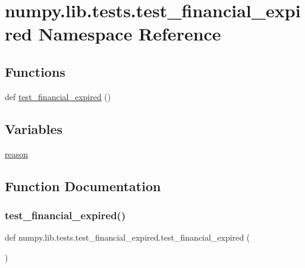 \hypertarget{namespacenumpy_1_1lib_1_1tests_1_1test__financial__expired}{}\section{numpy.\+lib.\+tests.\+test\+\_\+financial\+\_\+expired Namespace Reference}
\label{namespacenumpy_1_1lib_1_1tests_1_1test__financial__expired}
\subsection*{Functions}
\begin{DoxyCompactItemize}
\item 
def \hyperlink{namespacenumpy_1_1lib_1_1tests_1_1test__financial__expired_a590f4ebe96b758940e1f397672625c87}{test\+\_\+financial\+\_\+expired} ()
\end{DoxyCompactItemize}
\subsection*{Variables}
\begin{DoxyCompactItemize}
\item 
\hyperlink{namespacenumpy_1_1lib_1_1tests_1_1test__financial__expired_a9d91f90c0229b3116214f633efb60e3b}{reason}
\end{DoxyCompactItemize}


\subsection{Function Documentation}
\mbox{\label{namespacenumpy_1_1lib_1_1tests_1_1test__financial__expired_a590f4ebe96b758940e1f397672625c87}} 
\subsubsection{\texorpdfstring{test\+\_\+financial\+\_\+expired()}{test\_financial\_expired()}}
{\footnotesize\ttfamily def numpy.\+lib.\+tests.\+test\+\_\+financial\+\_\+expired.\+test\+\_\+financial\+\_\+expired (\begin{DoxyParamCaption}{ }\end{DoxyParamCaption})}




